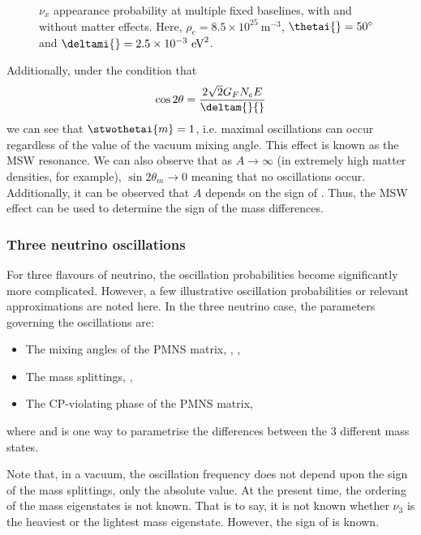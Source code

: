 \begin{figure}[h]
  \centering
  \begin{adjustbox}{max totalsize={.6\textwidth}, center}
    
  \end{adjustbox}
  \caption[Two neutrino appearance probabilities with and without matter effects.]{$\nu_{x}$ appearance probability at multiple fixed baselines, with and without matter effects. Here, $\rho_{e} = 8.5 \times 10^{25}~\text{m}^{-3}$, $\thetai{} = 50^{\circ}$ and $\deltami{} = 2.5 \times 10^{-3}~\text{eV}^{2}$.}
  \label{fig:twoNuMSW}
\end{figure}

Additionally, under the condition that
\begin{equation}
  \cos 2\theta = \frac{2 \sqrt{2} G_{F} N_{e} E}{\deltam{}{}}
\end{equation}
we can see that $\stwothetai{m} = 1$, i.e. maximal oscillations can occur regardless of the value of the vacuum mixing angle.
This effect is known as the MSW resonance.
We can also observe that as $A \rightarrow \infty$ (in extremely high matter densities, for example), $\sin 2\theta_{m} \rightarrow 0$ meaning that no oscillations occur.
Additionally, it can be observed that $A$ depends on the sign of \deltami{}.
Thus, the MSW effect can be used to determine the sign of the mass differences.

\subsubsection{Three neutrino oscillations}
\label{sec:theory:theory:threeNeutrino}

For three flavours of neutrino, the oscillation probabilities become significantly more complicated.
However, a few illustrative oscillation probabilities or relevant approximations are noted here.
In the three neutrino case, the parameters governing the oscillations are:
\begin{itemize}
\item The mixing angles of the PMNS matrix, , , 
\item The mass splittings, , 
\item The CP-violating phase of the PMNS matrix, \dcp
\end{itemize}
where  and  is one way to parametrise the differences between the 3 different mass states.

Note that, in a vacuum, the oscillation frequency does not depend upon the sign of the mass splittings, only the absolute value.
At the present time, the ordering of the mass eigenstates is not known.
That is to say, it is not known whether $\nu_{3}$ is the heaviest or the lightest mass eigenstate.
However, the sign of  is known.

